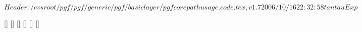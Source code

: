 %
%
%

\ProvidesFileRCS $Header: /cvsroot/pgf/pgf/generic/pgf/basiclayer/pgfcorepathusage.code.tex,v 1.7 2006/10/16 22:32:58 tantau Exp $


%
%
%

[]{\def\pgf@up@stroke{stroke}}
[]{\def\pgf@up@stroke{stroke}}
[]{\def\pgf@up@fill{fill}}
[]{\def\pgf@up@clip{clip}}
[]{}
[]{\def\pgf@up@bb{\pgf@relevantforpicturesizefalse}}

